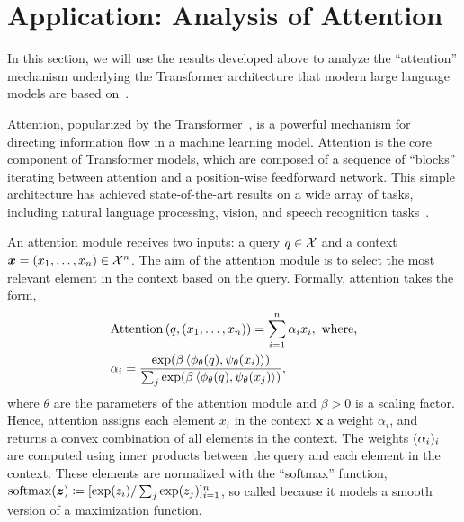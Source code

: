 \section{Application: Analysis of Attention}\label{sec:app_attention}

In this section, we will use the results developed above to analyze the ``attention'' mechanism underlying the Transformer architecture that modern large language models are based on~\parencite[e.g.,][]{chungScalingInstructionFinetunedLanguage2022,openaiGPT4TechnicalReport2023,touvronLlamaOpenFoundation2023,taoriAlpacaStrongReplicable2023}.

Attention, popularized by the Transformer~\parencite{vaswani2017attention}, is a powerful mechanism for directing information flow in a machine learning model. Attention is the core component of Transformer models, which are composed of a sequence of ``blocks'' iterating between attention and a position-wise feedforward network. This simple architecture has achieved state-of-the-art results on a wide array of tasks, including natural language processing, vision, and speech recognition tasks~\parencite[e.g.,][]{devlinBertPretrainingDeep2018,dongSpeechtransformerNorecurrenceSequencetosequence2018,dosovitskiyImageWorth16x162020,raffelExploringLimitsTransfer2020,liuSwinTransformerHierarchical2021}.

An attention module receives two inputs: a query $q \in {\mathcal{X}}$ and a context $\bm{x} = (x_1, \ldots, x_n) \in {\mathcal{X}}^n$. The aim of the attention module is to select the most relevant element in the context based on the query. Formally, attention takes the form,
\begin{equation}\label{eq:def_attention}
    \begin{split}
        &\mathrm{Attention}\paren{q, (x_1, \ldots, x_n)} = \sum_{i=1}^n \alpha_i x_i, \ \text{where,} \\
        &\alpha_i = \frac{\exp(\beta \iprod{\phi_\theta(q)}{\psi_\theta(x_i)})}{\sum_j \exp(\beta \iprod{\phi_\theta(q)}{\psi_\theta(x_j)})},
    \end{split}
\end{equation}
where $\theta$ are the parameters of the attention module and $\beta > 0$ is a scaling factor. Hence, attention assigns each element $x_i$ in the context $\bm{x}$ a weight $\alpha_i$, and returns a convex combination of all elements in the context. The weights $(\alpha_i)_i$ are computed using inner products between the query and each element in the context. These elements are normalized with the ``softmax'' function, $\mathrm{softmax}(\bm{z}) \coloneq [\exp(z_i) / \sum_j \exp(z_j)]_{i=1}^{n}$, so called because it models a smooth version of a maximization function.

